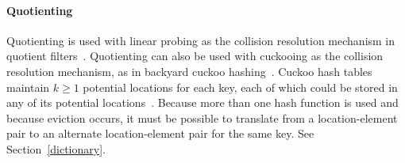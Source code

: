 \documentclass[letterpaper,twocolumn,10pt]{article}
\begin{document}



\paragraph{Quotienting} Quotienting is used with linear probing as the collision resolution mechanism in quotient filters~\cite{quotient-filter}.
Quotienting can also be used with cuckooing as the collision resolution mechanism, as in backyard cuckoo hashing~\cite{backyard}.
Cuckoo hash tables maintain $k \ge 1$ potential locations for each key, each of which could be stored in any of its potential locations~\cite{cuckoo-journal}.
Because more than one hash function is used and because eviction occurs, it must be possible to translate from a location-element pair to an alternate location-element pair for the same key.
See Section~\ref{dictionary}.


\end{document}
